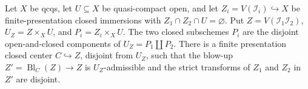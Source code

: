 \begin{lemma}
  \label{lemma:nagata-separate-closed-data-exists}

  Let $X$ be qcqs, let $U\subseteq X$ be quasi-compact open, and let
  $Z_i=V(\mathcal I_i)\hookrightarrow X$ be finite-presentation closed
  immersions with $Z_1\cap Z_2\cap U=\varnothing$.  Put
  $Z=V(\mathcal I_1\mathcal I_2)$, $U_Z=Z\times_XU$, and
  $P_i=Z_i\times_XU$.  The two closed subschemes $P_i$ are the disjoint
  open-and-closed components of $U_Z=P_1\amalg P_2$.  There is a finite
  presentation closed center $C\hookrightarrow Z$, disjoint from $U_Z$, such
  that the blow-up $Z' = \operatorname{Bl}_C(Z)\to Z$ is $U_Z$-admissible
  and the strict transforms of $Z_1$ and $Z_2$ in $Z'$ are disjoint.
\end{lemma}

